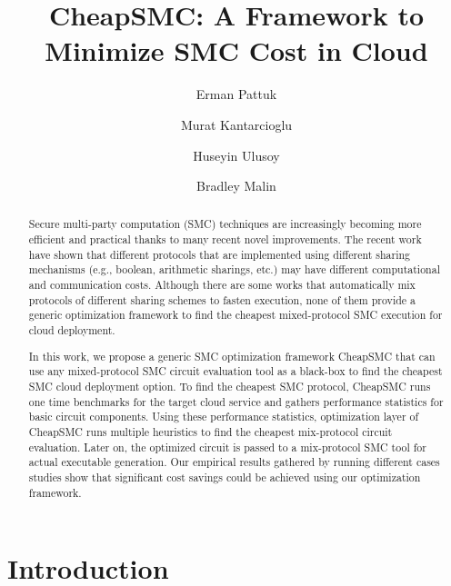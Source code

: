 \documentclass{llncs}
\newcommand{\sysname}{{CheapSMC}\xspace}
\begin{document}
\title{\sysname: A Framework to Minimize SMC Cost in Cloud}

\author{Erman Pattuk \and Murat Kantarcioglu \and Huseyin Ulusoy \and Bradley Malin}


\maketitle

\begin{abstract}
Secure multi-party computation (SMC) techniques are increasingly becoming more efficient and practical thanks to many recent novel improvements. The recent work have shown that different protocols that are implemented using different sharing mechanisms (e.g., boolean, arithmetic sharings, etc.) may have different computational and communication costs. Although there are some works that automatically mix protocols of different sharing schemes to fasten execution, none of them provide a generic optimization framework to find the cheapest mixed-protocol SMC execution for cloud deployment.

In this work, we propose a generic SMC optimization framework \sysname that can use any mixed-protocol SMC circuit evaluation tool as a black-box to find the cheapest SMC cloud deployment option. To find the cheapest SMC protocol, \sysname runs one time benchmarks for the target cloud service and gathers performance statistics for basic circuit components. Using these performance statistics, optimization layer of \sysname runs multiple heuristics to find the cheapest mix-protocol circuit evaluation. 
Later on, the optimized circuit is passed to a mix-protocol SMC tool for actual executable generation. Our empirical results gathered by running different cases studies show that significant cost savings could be achieved using our optimization framework.
\end{abstract}

\section{Introduction}
\label{sec:intro}
\end{document}
